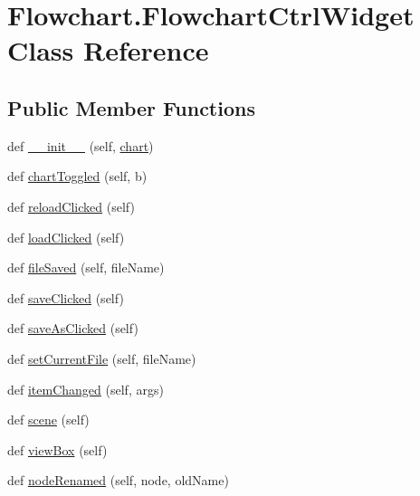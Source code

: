 \hypertarget{classFlowchart_1_1FlowchartCtrlWidget}{}\section{Flowchart.\+Flowchart\+Ctrl\+Widget Class Reference}
\label{classFlowchart_1_1FlowchartCtrlWidget}
\subsection*{Public Member Functions}
\begin{DoxyCompactItemize}
\item 
def \hyperlink{classFlowchart_1_1FlowchartCtrlWidget_add87f8852015b0f5ea759e4b190c07f6}{\+\_\+\+\_\+init\+\_\+\+\_\+} (self, \hyperlink{classFlowchart_1_1FlowchartCtrlWidget_a78d9548db343b8db6cf06ebd0ea8e2f4}{chart})
\item 
def \hyperlink{classFlowchart_1_1FlowchartCtrlWidget_aa6b271ab2a94eae72b87cc212d86915d}{chart\+Toggled} (self, b)
\item 
def \hyperlink{classFlowchart_1_1FlowchartCtrlWidget_a73b43b50243f4f4b48a57bd4fdc211f1}{reload\+Clicked} (self)
\item 
def \hyperlink{classFlowchart_1_1FlowchartCtrlWidget_ac7baaa8f68f752e8f2f6805749ead72c}{load\+Clicked} (self)
\item 
def \hyperlink{classFlowchart_1_1FlowchartCtrlWidget_ad3fd41da6933186b7b12f52c612671c0}{file\+Saved} (self, file\+Name)
\item 
def \hyperlink{classFlowchart_1_1FlowchartCtrlWidget_a07e6e27deb706dea32ad2d6a6b7b002c}{save\+Clicked} (self)
\item 
def \hyperlink{classFlowchart_1_1FlowchartCtrlWidget_a8338b019613756e8fa08b784c62ca5a8}{save\+As\+Clicked} (self)
\item 
def \hyperlink{classFlowchart_1_1FlowchartCtrlWidget_ae9167bea0d4227887017a8e349434800}{set\+Current\+File} (self, file\+Name)
\item 
def \hyperlink{classFlowchart_1_1FlowchartCtrlWidget_a2f6bcc49acd98b685b63fb50f8c22a82}{item\+Changed} (self, args)
\item 
def \hyperlink{classFlowchart_1_1FlowchartCtrlWidget_a6ccf029891f573bd3a6c2e7f00d6cc0b}{scene} (self)
\item 
def \hyperlink{classFlowchart_1_1FlowchartCtrlWidget_a731590e71c050a44894dab07b7600606}{view\+Box} (self)
\item 
def \hyperlink{classFlowchart_1_1FlowchartCtrlWidget_a49246a82dc37f2d452a43250a368e219}{node\+Renamed} (self, node, old\+Name)

\end{DoxyCompactItemize}
